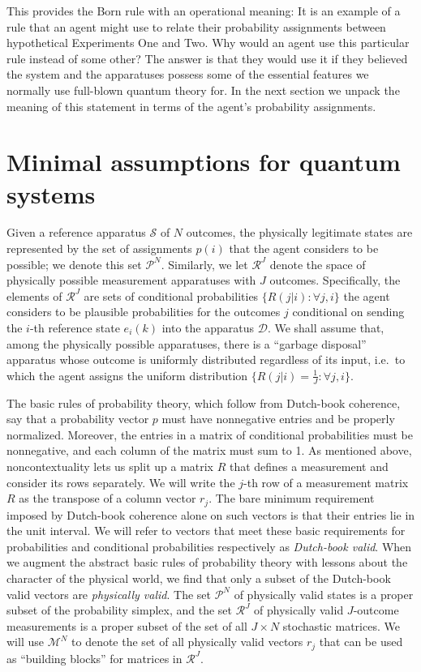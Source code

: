 \documentclass[%
 reprint,superscriptaddress,
 amsmath,amssymb,
 aps,pra, onecolumn, 12pt
]{revtex4-2}
\newcommand{\tit}[1]{\textit{#1}}
\newcommand{\onestage}{{One}}
\newcommand{\twostage}{{Two}}
\begin{document}
This provides the Born rule with an operational meaning: It is an example of a rule that an agent might use to relate their probability assignments between hypothetical Experiments \onestage{} and \twostage. Why would an agent use this particular rule instead of some other? The answer is that they would use it if they believed the system and the apparatuses possess some of the essential features we normally use full-blown quantum theory for. In the next section we unpack the meaning of this statement in terms of the agent's probability assignments.

\section{Minimal assumptions for quantum systems \label{sec:core}}

Given a reference apparatus $\mathcal{S}$ of $N$ outcomes, the physically legitimate states are represented by the set of assignments $p(i)$ that the agent considers to be possible; we denote this set $\mathcal{P}^N$. Similarly, we let $\mathcal{R}^J$ denote the space of physically possible measurement apparatuses with $J$ outcomes. Specifically, the elements of $\mathcal{R}^J$ are sets of conditional probabilities $\{R(j|i) : \forall j,i \}$ the agent considers to be plausible probabilities for the outcomes $j$ conditional on sending the $i$-th reference state $e_i(k)$ into the apparatus $\mathcal{D}$. We shall assume that, among the physically possible apparatuses, there is a ``garbage disposal'' apparatus whose outcome is uniformly distributed regardless of its input, i.e.\ to which the agent assigns the uniform distribution $\{ R(j|i)=\frac{1}{J} :  \forall j,i \}$.

The basic rules of probability theory, which follow from Dutch-book coherence, say that a probability vector $p$ must have nonnegative entries and be properly normalized. Moreover, the entries in a matrix of conditional probabilities must be nonnegative, and each column of the matrix must sum to 1. As mentioned above, noncontextuality lets us split up a matrix $R$ that defines a measurement and consider its rows separately. We will write the $j$-th row of a measurement matrix $R$ as the transpose of a column vector $r_j$. The bare minimum requirement imposed by Dutch-book coherence alone on such vectors is that their entries lie in the unit interval. We will refer to vectors that meet these basic requirements for probabilities and conditional probabilities respectively as \tit{Dutch-book valid}. When we augment the abstract basic rules of probability theory with lessons about the character of the physical world, we find that only a subset of the Dutch-book valid vectors are \tit{physically valid}. The set $\mathcal{P}^N$ of physically valid states is a proper subset of the probability simplex, and the set $\mathcal{R}^J$ of physically valid $J$-outcome measurements is a proper subset of the set of all $J \times N$ stochastic matrices. We will use $\mathcal{M}^N$ to denote the set of all physically valid vectors $r_j$ that can be used as ``building blocks'' for matrices in $\mathcal{R}^J$.
\end{document}
